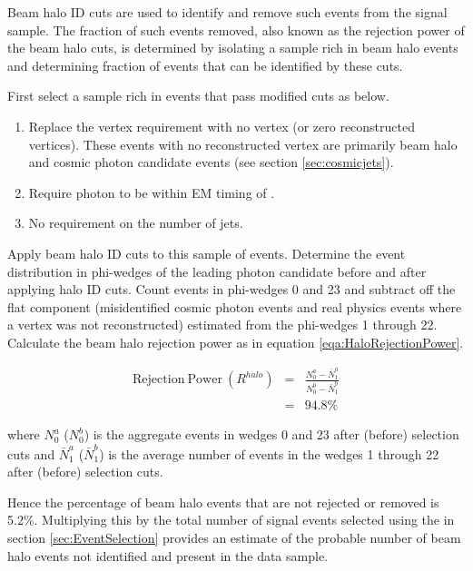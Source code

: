 \documentclass[11pt]{article}
\begin{document}
Beam halo ID cuts are used to identify and remove such events from the signal sample. The fraction of such events removed, also known as the  rejection power of the beam halo cuts, is determined by isolating a sample rich in beam halo events and determining fraction of events that can be identified by these cuts.

First select a sample rich in  events that pass modified  cuts as below.

\begin{enumerate}
 \item Replace the vertex requirement with no vertex (or zero reconstructed vertices). These events with no reconstructed vertex are primarily beam halo and cosmic photon candidate events (see section \ref{sec:cosmicjets}).
 \item Require photon to be within EM timing of \intimewindow.
 \item No requirement on the number of jets.
\end{enumerate}

Apply beam halo ID cuts to this sample of events. Determine the event distribution in phi-wedges of the leading photon candidate before and after applying halo ID cuts. Count events in phi-wedges 0 and 23 and subtract off the flat component (misidentified cosmic photon events and real physics events where a vertex was not reconstructed) estimated from the phi-wedges 1 through 22. Calculate the beam halo rejection power as in equation \ref{eqa:HaloRejectionPower}.

\begin{eqnarray}
 \mathrm{Rejection~Power}~(R^{halo})&=& \frac{N_{0}^{a} - {\bar{N}_{1}^{a} }}{N_{0}^{b} - {\bar{N}_{1}^{b} }}\\
 &=& 94.8\% \nonumber
\label{eqa:HaloRejectionPower}
\end{eqnarray}

\noindent where $N_{0}^{a}$ ($N_{0}^{b}$) is the aggregate events in wedges 0 and 23 after (before) selection cuts and $\bar{N}_{1}^{a}$ ($\bar{N}_{1}^{b}$) is the average number of events in the wedges 1 through 22 after (before) selection cuts.

Hence the percentage of beam halo events that are not rejected or removed is 5.2\%. Multiplying this by the total number of signal events selected using the  in section \ref{sec:EventSelection} provides an estimate of the probable number of beam halo events not identified and present in the data sample.
\end{document}
